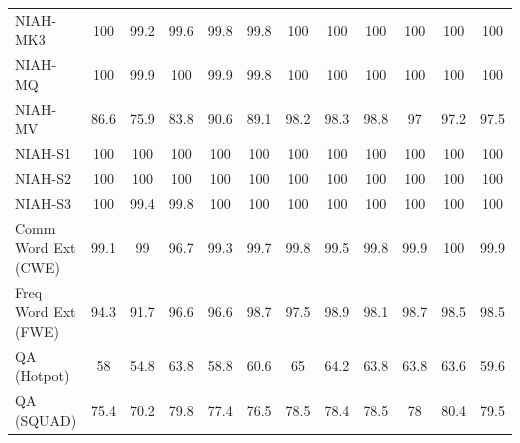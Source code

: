 \begin{table}[ht]
\begin{tabular}{l|ccccc|ccccc|c}
NIAH-MK3 & 100 & \cellcolor{myred!90} 99.2 & \cellcolor{myred!45} 99.6 & \cellcolor{myred!23} 99.8 & \cellcolor{myred!23} 99.8 & 100 & 100 & 100 & 100 & 100 & 100 \\
NIAH-MQ & 100 & \cellcolor{myred!45} 99.9 & \cellcolor{royalblue!22} 100 & \cellcolor{myred!22} 99.9 & \cellcolor{myred!90} 99.8 & \cellcolor{royalblue!22} 100 & \cellcolor{royalblue!22} 100 & \cellcolor{royalblue!22} 100 & \cellcolor{royalblue!22} 100 & \cellcolor{royalblue!22} 100 & 100 \\
NIAH-MV & \cellcolor{myred!46} 86.6 & \cellcolor{myred!90} 75.9 & \cellcolor{myred!57} 83.8 & \cellcolor{myred!29} 90.6 & \cellcolor{myred!35} 89.1 & \cellcolor{royalblue!3} 98.2 & \cellcolor{royalblue!3} 98.3 & \cellcolor{royalblue!5} 98.8 & \cellcolor{myred!2} 97 & \cellcolor{myred!1} 97.2 & 97.5 \\
NIAH-S1 & 100 & 100 & 100 & 100 & 100 & 100 & 100 & 100 & 100 & 100 & 100 \\
NIAH-S2 & 100 & 100 & 100 & 100 & 100 & 100 & 100 & 100 & 100 & 100 & 100 \\
NIAH-S3 & 100 & \cellcolor{myred!90} 99.4 & \cellcolor{myred!30} 99.8 & 100 & 100 & 100 & 100 & 100 & 100 & 100 & 100 \\
Comm Word Ext (CWE) & \cellcolor{myred!23} 99.1 & \cellcolor{myred!26} 99 & \cellcolor{myred!90} 96.7 & \cellcolor{myred!17} 99.3 & \cellcolor{myred!6} 99.7 & \cellcolor{myred!3} 99.8 & \cellcolor{myred!13} 99.5 & \cellcolor{myred!3} 99.8 & \cellcolor{myred!1} 99.9 & \cellcolor{royalblue!2} 100 & 99.9 \\
Freq Word Ext (FWE) & \cellcolor{myred!56} 94.3 & \cellcolor{myred!90} 91.7 & \cellcolor{myred!26} 96.6 & \cellcolor{myred!26} 96.6 & \cellcolor{royalblue!2} 98.7 & \cellcolor{myred!13} 97.5 & \cellcolor{royalblue!5} 98.9 & \cellcolor{myred!6} 98.1 & \cellcolor{royalblue!3} 98.7 & 98.5 & 98.5 \\
QA (Hotpot) & \cellcolor{myred!27} 58 & \cellcolor{myred!80} 54.8 & \cellcolor{royalblue!70} 63.8 & \cellcolor{myred!13} 58.8 & \cellcolor{royalblue!17} 60.6 & \cellcolor{royalblue!90} 65 & \cellcolor{royalblue!77} 64.2 & \cellcolor{royalblue!70} 63.8 & \cellcolor{royalblue!70} 63.8 & \cellcolor{royalblue!67} 63.6 & 59.6 \\
QA (SQUAD) & \cellcolor{myred!39} 75.4 & \cellcolor{myred!90} 70.2 & \cellcolor{royalblue!3} 79.8 & \cellcolor{myred!20} 77.4 & \cellcolor{myred!29} 76.5 & \cellcolor{myred!10} 78.5 & \cellcolor{myred!10} 78.4 & \cellcolor{myred!9} 78.5 & \cellcolor{myred!14} 78 & \cellcolor{royalblue!9} 80.4 & 79.5 \\

\end{tabular}
\end{table}

